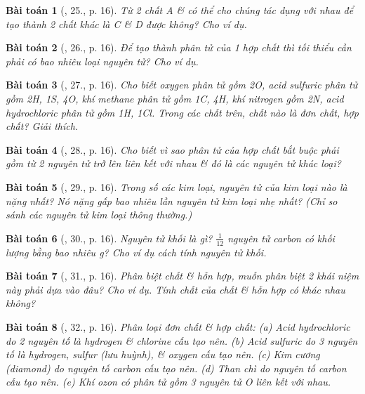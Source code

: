 \documentclass{article}
\newtheorem{baitoan}{Bài toán}
\begin{document}
\begin{baitoan}[\cite{An_Hoa_Hoc_nang_cao_8_9}, 25., p. 16]
	Từ 2 chất A \& có thể cho chúng tác dụng với nhau để tạo thành 2 chất khác là C \& D được không? Cho ví dụ.
\end{baitoan}

\begin{baitoan}[\cite{An_Hoa_Hoc_nang_cao_8_9}, 26., p. 16]
	Để tạo thành phân tử của 1 hợp chất thì tối thiểu cần phải có bao nhiêu loại nguyên tử? Cho ví dụ.
\end{baitoan}

\begin{baitoan}[\cite{An_Hoa_Hoc_nang_cao_8_9}, 27., p. 16]
	Cho biết oxygen phân tử gồm {\rm2O}, acid sulfuric phân tử gồm {\rm2H, 1S, 4O}, khí methane phân tử gồm {\rm1C, 4H}, khí nitrogen gồm {\rm2N}, acid hydrochloric phân tử gồm {\rm1H, 1Cl}. Trong các chất trên, chất nào là đơn chất, hợp chất? Giải thích.
\end{baitoan}

\begin{baitoan}[\cite{An_Hoa_Hoc_nang_cao_8_9}, 28., p. 16]
	Cho biết vì sao phân tử của hợp chất bắt buộc phải gồm từ 2 nguyên tử trở lên liên kết với nhau \& đó là các nguyên tử khác loại?
\end{baitoan}

\begin{baitoan}[\cite{An_Hoa_Hoc_nang_cao_8_9}, 29., p. 16]
	Trong số các kim loại, nguyên tử của kim loại nào là nặng nhất? Nó nặng gấp bao nhiêu lần nguyên tử kim loại nhẹ nhất? (Chỉ so sánh các nguyên tử kim loại thông thường.)
\end{baitoan}

\begin{baitoan}[\cite{An_Hoa_Hoc_nang_cao_8_9}, 30., p. 16]
	Nguyên tử khối là gì? $\frac{1}{12}$ nguyên tử carbon có khối lượng bằng bao nhiêu {\rm g}? Cho ví dụ cách tính nguyên tử khối.
\end{baitoan}

\begin{baitoan}[\cite{An_Hoa_Hoc_nang_cao_8_9}, 31., p. 16]
	Phân biệt chất \& hỗn hợp, muốn phân biệt 2 khái niệm này phải dựa vào đâu? Cho ví dụ. Tính chất của chất \& hỗn hợp có khác nhau không?
\end{baitoan}

\begin{baitoan}[\cite{An_Hoa_Hoc_nang_cao_8_9}, 32., p. 16]
	Phân loại đơn chất \& hợp chất: (a) Acid hydrochloric do 2 nguyên tố là hydrogen \& chlorine cấu tạo nên. (b) Acid sulfuric do 3 nguyên tố là hydrogen, sulfur (lưu huỳnh), \& oxygen cấu tạo nên. (c) Kim cương (diamond) do nguyên tố carbon cấu tạo nên. (d) Than chì do nguyên tố carbon cấu tạo nên. (e) Khí ozon có phân tử gồm 3 nguyên tử {\rm O} liên kết với nhau.
\end{baitoan}
\end{document}

